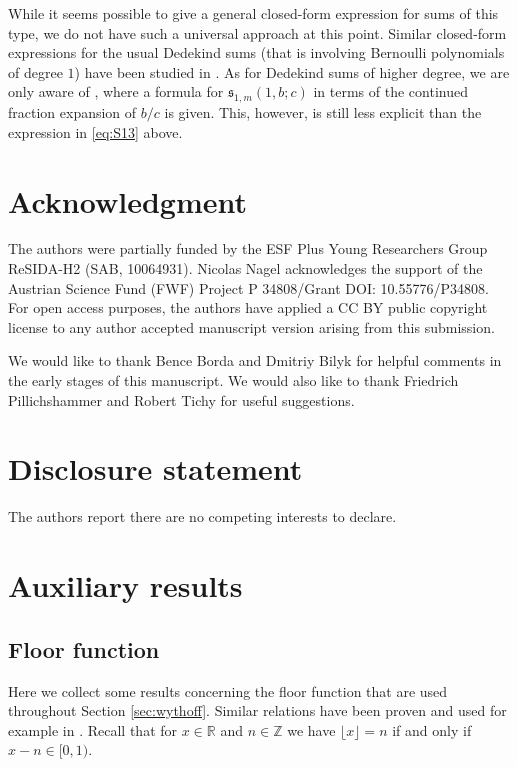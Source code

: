 \documentclass[]{interact}
\newcommand{\bbR}{\mathbb{R}}
\newcommand{\bbZ}{\mathbb{Z}}
\newcommand{\frs}{\mathfrak{s}}
\theoremstyle{definition}
\numberwithin{table}{section} %
\numberwithin{figure}{section}
\begin{document}
While it seems possible to give a general closed-form expression for sums of this type, we do not have such a universal approach at this point. Similar closed-form expressions for the usual Dedekind sums (that is involving Bernoulli polynomials of degree $1$) have been studied in \cite{Cet23, DM10, DEKT22, LZ13, San23, ZY00, ZW04}. As for Dedekind sums of higher degree, we are only aware of \cite{Tak79}, where a formula for $\frs_{1,m}(1,b;c)$ in terms of the continued fraction expansion of $b/c$ is given. This, however, is still less explicit than the expression in \eqref{eq:S13} above.

\section*{Acknowledgment}

The authors were partially funded by the ESF Plus Young Researchers Group ReSIDA-H2 (SAB, 10064931). Nicolas Nagel acknowledges the support of the Austrian Science Fund (FWF) Project  P 34808/Grant DOI: 10.55776/P34808. For open access purposes, the authors have applied a CC BY public copyright license to any author accepted manuscript version arising from this submission.

We would like to thank Bence Borda and Dmitriy Bilyk for helpful comments in the early stages of this manuscript. We would also like to thank Friedrich Pillichshammer and Robert Tichy for useful suggestions.

\section*{Disclosure statement}

The authors report there are no competing interests to declare.




\appendix

\section{Auxiliary results}

\subsection{Floor function}

Here we collect some results concerning the floor function that are used throughout Section \ref{sec:wythoff}. Similar relations have been proven and used for example in \cite{Con59, Kim95, Kim20, Mor80}. Recall that for $x \in \bbR$ and $n \in \bbZ$ we have $\lfloor x \rfloor = n$ if and only if $x-n \in [0, 1)$.
\end{document}
